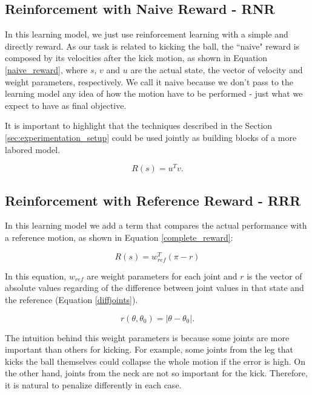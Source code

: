 \subsection{Reinforcement with Naive Reward - RNR }
In this learning model, we just use reinforcement learning with a simple and directly reward. As our task is related to kicking the ball, the ``naive" reward is composed by its velocities after the kick motion, as shown in Equation \eqref{naive_reward}, where $s$, $v$ and $u$ are the actual state, the vector of velocity and weight parameters, respectively. We call it naive because we don't pass to the learning model any idea of how the motion have to be performed - just what we expect to have as final objective. 

It is important to highlight that the techniques described in the Section \ref{sec:experimentation_setup} could be used jointly as building blocks of a more labored model.

\begin{equation}
R(s) = u^{T}v.
\label{naive_reward}
\end{equation}

\subsection{Reinforcement with Reference Reward - RRR }
In this learning model we add a term that compares the actual performance with a reference motion, as shown in Equation \eqref{complete_reward}:

\begin{equation}
R(s) = w_{ref}^{T}(\pi - r)
\label{complete_reward}
\end{equation}

In this equation, $w_{ref}$ are weight parameters for each joint and $r$ is the vector of absolute values regarding of the difference between joint values in that state and the reference (Equation \eqref{diffjoints}).

\begin{equation}
r(\theta, \theta_{0}) = \lvert\theta - \theta_{0}\rvert.
\label{diffjoints}
\end{equation}

The intuition behind this weight parameters is because some joints are more important than others for kicking. For example, some joints from the leg that kicks the ball themselves could collapse the whole motion if the error is high. On the other hand, joints from the neck are not so important for the kick. Therefore, it is natural to penalize differently in each case.

